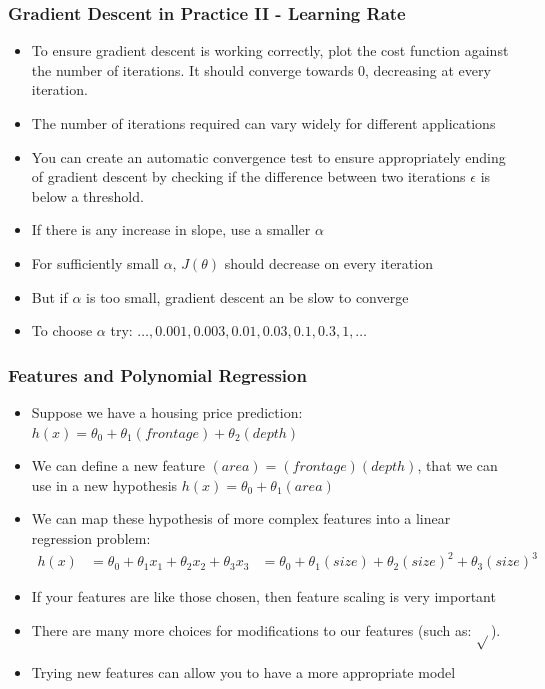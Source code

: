 \subsubsection{Gradient Descent in Practice II - Learning Rate}
\begin{itemize}[--]
	\item To ensure gradient descent is working correctly, plot the cost function against the number of iterations. It should converge towards 0, decreasing at every iteration.
	\item The number of iterations required can vary widely for different applications
	\item You can create an automatic convergence test to ensure appropriately ending of gradient descent by checking if the difference between two iterations $\epsilon$ is below a threshold.
	\item If there is any increase in slope, use a smaller $\alpha$
	\item For sufficiently small $\alpha$, $J(\theta )$ should decrease on every iteration
	\item But if $\alpha$ is too small, gradient descent an be slow to converge
	\item To choose $\alpha$ try: $\ldots, 0.001, 0.003, 0.01, 0.03, 0.1, 0.3, 1,\ldots$
\end{itemize}

\subsubsection{Features and Polynomial Regression}
\begin{itemize}[--]
	\item Suppose we have a housing price prediction: $h(x)=\theta_0 + \theta_1 (frontage)+\theta_2 (depth)$
	\item We can define a new feature $(area)=(frontage)(depth)$, that we can use in a new hypothesis $h(x)=\theta_0+\theta_1 (area)$
	\item We can map these hypothesis of more complex features into a linear regression problem: 
	\begin{align*}
		h(x)&=\theta_0 + \theta_1 x_1 + \theta_2 x_2 + \theta_3 x_3    
  		  	&=\theta_0 + \theta_1 (size) + \theta_2 (size)^2 + \theta_3 (size)^3
	\end{align*}

	\item If your features are like those chosen, then feature scaling is very important
	\item There are many more choices for modifications to our features (such as: $\sqrt{}$).
	\item Trying new features can allow you to have a more appropriate model
\end{itemize}

